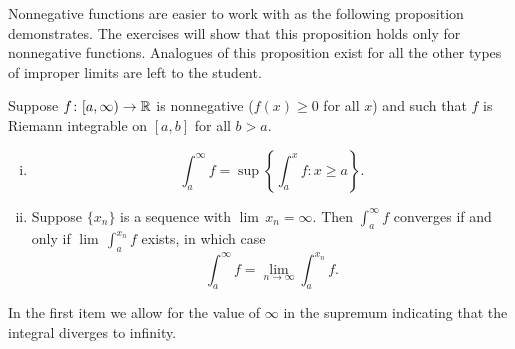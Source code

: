 Nonnegative functions are easier to work with
as the following proposition demonstrates.
The exercises will show that this proposition
holds only for nonnegative functions.
Analogues of this proposition
exist for all the other types of improper limits are left to the
student.

\begin{prop} \label{impropriemann:possimp}
Suppose $f \colon [a,\infty) \to {\mathbb{R}}$ is nonnegative ($f(x)
\geq 0$ for all $x$) and such that
$f$ is Riemann integrable on $[a,b]$ for all $b > a$.
\begin{enumerate}[(i)]
\item 
\begin{equation*}
\int_a^\infty f = \sup \left\{ \int_a^x f : x \geq a \right\} .
\end{equation*}
\item
Suppose $\{ x_n \}$
is a sequence with $\lim\, x_n = \infty$.  Then
$\int_a^\infty f$ converges if and only if $\lim\, \int_a^{x_n} f$ exists, in
which case
\begin{equation*}
\int_a^\infty f = \lim_{n\to\infty} \int_a^{x_n} f .
\end{equation*}
\end{enumerate}
\end{prop}

In the first item we allow for the value of $\infty$ in the
supremum indicating that the integral diverges to infinity.

